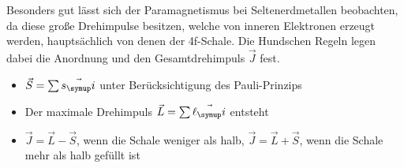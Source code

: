  \noindent Besonders gut lässt sich der Paramagnetismus bei Seltenerdmetallen beobachten,
 da diese große Drehimpulse besitzen, welche von inneren Elektronen erzeugt werden,
 hauptsächlich von denen der 4f-Schale. Die Hundschen Regeln legen dabei die
 Anordnung und den Gesamtdrehimpuls $\vec{J}$ fest.
 \begin{itemize}
   \item $\vec{S} = \sum \vec{s_\su{i}}$ unter Berücksichtigung des
   Pauli-Prinzips \\
   \item Der maximale Drehimpuls $\vec{L} = \sum \vec{\ell_\su{i}}$ entsteht \\
   \item $\vec{J} = \vec{L}-\vec{S}$, wenn die Schale weniger als halb,
   $\vec{J}= \vec{L}+\vec{S}$, wenn die Schale mehr als halb gefüllt ist \\
 \end{itemize}
